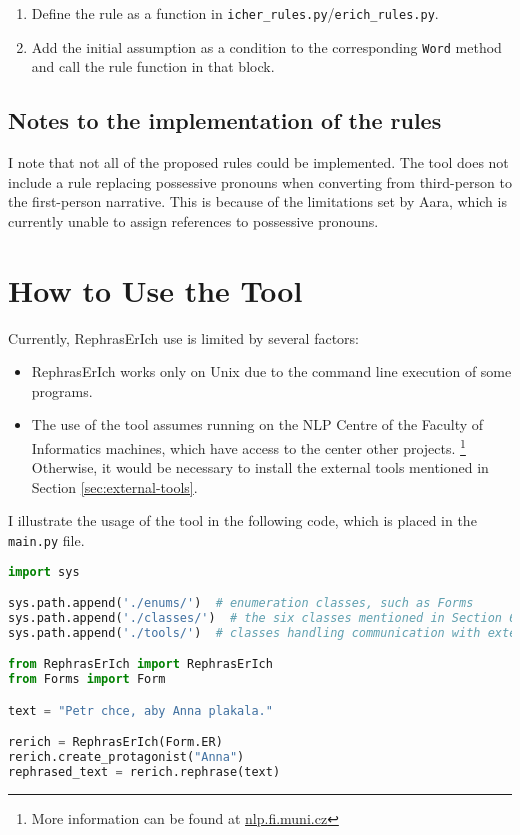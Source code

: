 \begin{enumerate}
	\item Define the rule as a function in \texttt{icher\_rules.py}/\texttt{erich\_rules.py}.
	\item Add the initial assumption as a condition to the corresponding \texttt{Word} method and call the rule function in that block.
\end{enumerate}

\subsection*{Notes to the implementation of the rules}

I note that not all of the proposed rules could be implemented. The tool does not include a rule replacing possessive pronouns when converting from third-person to the first-person narrative. This is because of the limitations set by Aara, which is currently unable to assign references to possessive pronouns.

\section{How to Use the Tool}

Currently, RephrasErIch use is limited by several factors:

\begin{itemize}
	\item RephrasErIch works only on Unix due to the command line execution of some programs.
	\item The use of the tool assumes running on the NLP Centre of the Faculty of Informatics machines, which have access to the center other projects. \footnote{More information can be found at \href{https://nlp.fi.muni.cz}{nlp.fi.muni.cz}} Otherwise, it would be necessary to install the external tools mentioned in Section \ref{sec:external-tools}.
\end{itemize}

I illustrate the usage of the tool in the following code, which is placed in the \texttt{main.py} file.
\newline

\begin{lstlisting}[language=Python]
import sys

sys.path.append('./enums/')  # enumeration classes, such as Forms
sys.path.append('./classes/')  # the six classes mentioned in Section 6.2
sys.path.append('./tools/')  # classes handling communication with external tools

from RephrasErIch import RephrasErIch
from Forms import Form

text = "Petr chce, aby Anna plakala."

rerich = RephrasErIch(Form.ER)
rerich.create_protagonist("Anna")
rephrased_text = rerich.rephrase(text)
\end{lstlisting}


